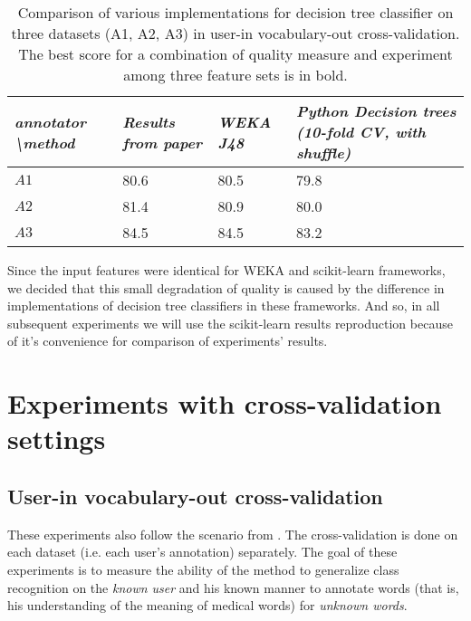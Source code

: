 \begin{table*}[h]
\begin{tabular}{L|LLL}
\hline
\textit{annotator \textbackslash method} & \textit{Results from paper \citep{Grabar-PITR2014}} & \textit{WEKA J48} & \textit{Python Decision trees (10-fold CV, with shuffle)} \\ \hline
$A1$ & 80.6 & 80.5 & 79.8 \\
$A2$ & 81.4 & 80.9 & 80.0 \\
$A3$ & 84.5 & 84.5 & 83.2 \\ \hline
\end{tabular}
    \caption{Comparison of various implementations for decision tree classifier on three datasets (A1, A2, A3) in user-in vocabulary-out cross-validation. The best score for a combination of quality measure and experiment among three feature sets is in bold.}
    \label{tab:results-reproduction}
\end{table*}

Since the input features were identical for WEKA and scikit-learn frameworks, we decided that this small degradation of quality is caused by the difference in implementations of decision tree classifiers in these frameworks. And so, in all subsequent experiments we will use the scikit-learn results reproduction because of it's convenience for comparison of experiments' results. 


\section{Experiments with cross-validation settings}
\subsection{User-in vocabulary-out cross-validation}

These experiments also follow the scenario from \cite{Grabar-PITR2014}. The cross-validation is done on each dataset (i.e. each user's annotation) separately. The goal of these experiments is to measure the ability of the method to generalize class recognition on the \textit{known user} and his known manner to annotate words (that is, his understanding of the meaning of medical words) for \textit{unknown words}. 

